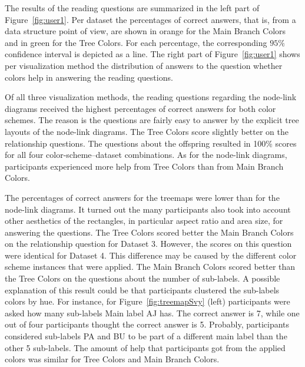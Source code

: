 \documentclass[journal]{vgtc}                %
\begin{document}
The results of the reading questions are summarized in the left part of Figure~\ref{fig:user1}. Per dataset the percentages of correct answers, that is, from a data structure point of view, are shown in orange for the Main Branch Colors and in green for the Tree Colors. For each percentage, the corresponding $95\%$ confidence interval is depicted as a line. The right part of Figure~\ref{fig:user1} shows per visualization method the distribution of answers to the question whether colors help in answering the reading questions.

Of all three visualization methods, the reading questions regarding the node-link diagrams received the highest percentages of correct answers for both color schemes. The reason is the questions are fairly easy to answer by the explicit tree layouts of the node-link diagrams. The Tree Colors score slightly better on the relationship questions. The questions about the offspring resulted in 100\% scores for all four color-scheme--dataset combinations. As for the node-link diagrams, participants experienced more help from Tree Colors than from Main Branch Colors.


The percentages of correct answers for the treemaps were lower than for the node-link diagrams. It turned out the many participants also took into account other aesthetics of the rectangles, in particular aspect ratio and area size, for answering the questions. The Tree Colors scored better the Main Branch Colors on the relationship question for Dataset 3. However, the scores on this question were identical for Dataset 4. This difference may be caused by the different color scheme instances that were applied. The Main Branch Colors scored better than the Tree Colors on the questions about the number of sub-labels. A possible explanation of this result could be that participants clustered the sub-labels colors by hue. For instance, for Figure~\ref{fig:treemapSvy} (left) participants were asked how many sub-labels Main label AJ has. The correct answer is 7, while one out of four participants thought the correct answer is 5. Probably, participants considered sub-labels PA and BU to be part of a different main label than the other 5 sub-labels. The amount of help that participants got from the applied colors was similar for Tree Colors and Main Branch Colors.
\end{document}
